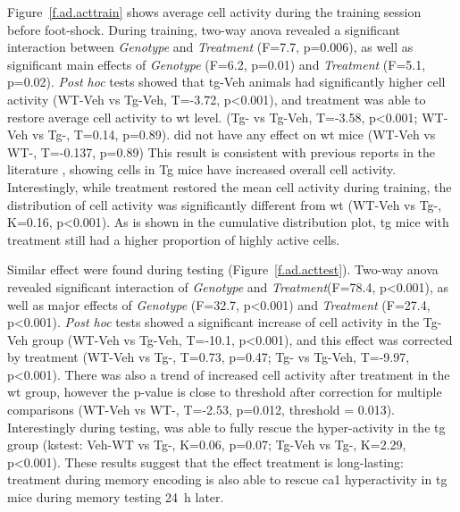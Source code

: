 Figure~\ref{f.ad.acttrain} shows average cell activity during the training session before foot-shock. During training, two-way \gls{anova} revealed a significant interaction between \textit{Genotype} and \textit{Treatment} (F=7.7, p=0.006), as well as significant main effects of \textit{Genotype} (F=6.2, p=0.01) and \textit{Treatment} (F=5.1, p=0.02). \textit{Post hoc} tests showed that \gls{tg}-Veh animals had significantly higher cell activity (WT-Veh vs Tg-Veh, T=-3.72, p<0.001), and \tglu{} treatment was able to restore average cell activity to \gls{wt} level. (Tg-\glu{} vs Tg-Veh, T=-3.58, p<0.001; WT-Veh vs Tg-\glu, T=0.14, p=0.89). \tglu{} did not have any effect on \gls{wt} mice (WT-Veh vs WT-\glu, T=-0.137, p=0.89) This result is consistent with previous reports in the literature \citep{verret12}, showing cells in Tg mice have increased overall cell activity. Interestingly, while \tglu{} treatment restored the mean cell activity during training, the distribution of cell activity was significantly different from \gls{wt} (WT-Veh vs Tg-\glu, K=0.16, p<0.001). As is shown in the cumulative distribution plot, \gls{tg} mice with \tglu{} treatment still had a higher proportion of highly active cells. 

Similar effect were found during testing (Figure~\ref{f.ad.acttest}). Two-way \gls{anova} revealed significant interaction of \textit{Genotype} and \textit{Treatment}(F=78.4, p<0.001), as well as major effects of \textit{Genotype} (F=32.7, p<0.001) and \textit{Treatment} (F=27.4, p<0.001). \textit{Post hoc} tests showed a significant increase of cell activity in the Tg-Veh group (WT-Veh vs Tg-Veh, T=-10.1, p<0.001), and this effect was corrected by \tglu{} treatment (WT-Veh vs Tg-\glu, T=0.73, p=0.47; Tg-\glu{} vs Tg-Veh, T=-9.97, p<0.001). There was also a trend of increased cell activity after \tglu{} treatment in the \gls{wt} group, however the p-value is close to threshold after correction for multiple comparisons (WT-Veh vs WT-\glu, T=-2.53, p=0.012, threshold = 0.013). Interestingly during testing, \tglu{} was able to fully rescue the hyper-activity in the \gls{tg} group (\gls{kstest}: Veh-WT vs Tg-\glu, K=0.06, p=0.07; Tg-Veh vs Tg-\glu, K=2.29, p<0.001). These results suggest that the effect \tglu{} treatment is long-lasting: treatment during memory encoding is also able to rescue \gls{ca1} hyperactivity in \gls{tg} mice during memory testing \SI{24}{\hour} later.

